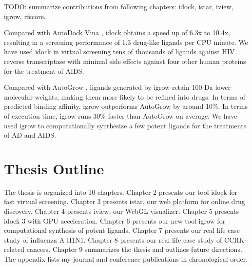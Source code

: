 TODO: summarize contributions from following chapters: idock, istar, iview, igrow, rfscore.

Compared with AutoDock Vina \citep{595}, idock obtains a speed up of 6.3x to 10.4x, resulting in a screening performance of 1.3 drug-like ligands per CPU minute. We have used idock in virtual screening tens of thousands of ligands against HIV reverse transcriptase with minimal side effects against four other human proteins for the treatment of AIDS.

Compared with AutoGrow \citep{466}, ligands generated by igrow retain 100 Da lower molecular weights, making them more likely to be refined into drugs. In terms of predicted binding affinity, igrow outperforms AutoGrow by around 10\%. In terms of execution time, igrow runs 30\% faster than AutoGrow on average. We have used igrow to computationally synthesize a few potent ligands for the treatments of AD and AIDS.

\section{Thesis Outline}

The thesis is organized into 10 chapters. Chapter 2 presents our tool idock for fast virtual screening. Chapter 3 presents istar, our web platform for online drug discovery. Chapter 4 presents iview, our WebGL visualizer. Chapter 5 presents idock 3 with GPU acceleration. Chapter 6 presents our new tool igrow for computational synthesis of potent ligands. Chapter 7 presents our real life case study of influenza A H1N1. Chapter 8 presents our real life case study of CCRK-related cancers. Chapter 9 summarizes the thesis and outlines future directions. The appendix lists my journal and conference publications in chronological order.

\chapterend
